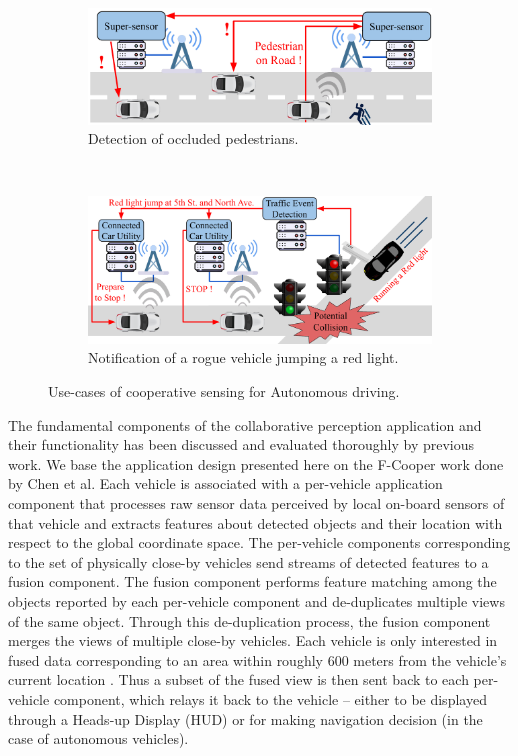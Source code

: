\begin{figure}[t!]
    \centering
    \begin{subfigure}[t]{0.45\textwidth}
        \centering
        \includegraphics[width=\textwidth]{figures/apps/pedestrian}
        \caption{Detection of occluded pedestrians.}
        \label{fig:pedestrian}
    \end{subfigure}%
    ~ 
    \begin{subfigure}[t]{0.45\textwidth}
        \centering
        \includegraphics[width=\textwidth]{figures/apps/redlight}
        \caption{Notification of a rogue vehicle jumping a red light.}
        \label{fig:redlight}
    \end{subfigure}
    \caption{Use-cases of cooperative sensing for Autonomous driving.}
\end{figure}
\par The fundamental components of the collaborative perception application and their functionality has been discussed and evaluated thoroughly by previous work\cite{fcooper, fusioneye, avr}. We base the application design presented here on the F-Cooper \cite{fcooper} work done by Chen et al. Each vehicle is associated with a per-vehicle application component that processes raw sensor data perceived by local on-board sensors of that vehicle and extracts features about detected objects and their location with respect to the global coordinate space.  The per-vehicle components corresponding to the set of physically close-by vehicles send streams of detected features to a fusion component. The fusion component performs feature matching among the objects reported by each per-vehicle component and de-duplicates  multiple views of the same object. Through this de-duplication process, the fusion component merges the views of multiple close-by vehicles.  Each vehicle is only interested in fused data corresponding to an area within roughly 600 meters from the vehicle's current location \cite{talkycars}. Thus a subset of the fused view is then sent back to each per-vehicle component, which relays it back to the vehicle -- either to be displayed through a Heads-up Display (HUD) or for making navigation decision (in the case of autonomous vehicles).

